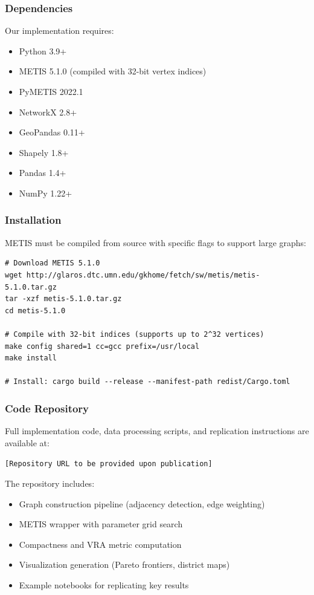 \subsubsection{Dependencies}

Our implementation requires:
\begin{itemize}
    \item Python 3.9+
    \item METIS 5.1.0 (compiled with 32-bit vertex indices)
    \item PyMETIS 2022.1
    \item NetworkX 2.8+
    \item GeoPandas 0.11+
    \item Shapely 1.8+
    \item Pandas 1.4+
    \item NumPy 1.22+
\end{itemize}

\subsubsection{Installation}

METIS must be compiled from source with specific flags to support large graphs:

\begin{verbatim}
# Download METIS 5.1.0
wget http://glaros.dtc.umn.edu/gkhome/fetch/sw/metis/metis-5.1.0.tar.gz
tar -xzf metis-5.1.0.tar.gz
cd metis-5.1.0

# Compile with 32-bit indices (supports up to 2^32 vertices)
make config shared=1 cc=gcc prefix=/usr/local
make install

# Install: cargo build --release --manifest-path redist/Cargo.toml
\end{verbatim}

\subsubsection{Code Repository}

Full implementation code, data processing scripts, and replication instructions are available at:

\begin{center}
\texttt{[Repository URL to be provided upon publication]}
\end{center}

The repository includes:
\begin{itemize}
    \item Graph construction pipeline (adjacency detection, edge weighting)
    \item METIS wrapper with parameter grid search
    \item Compactness and VRA metric computation
    \item Visualization generation (Pareto frontiers, district maps)
    \item Example notebooks for replicating key results
\end{itemize}

